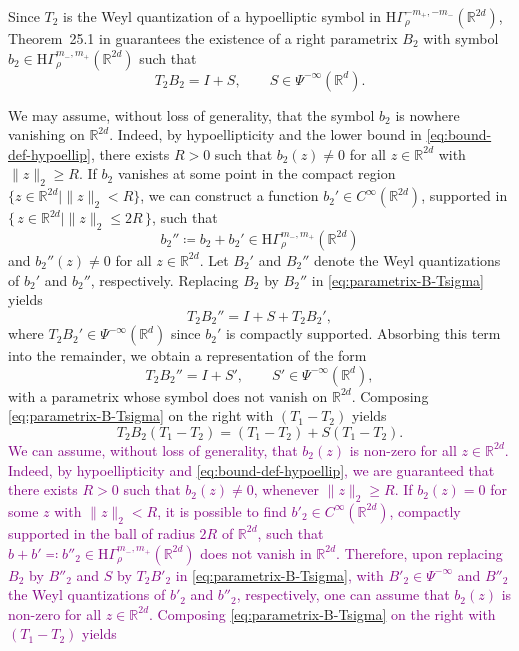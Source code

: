 \documentclass[a4paper,12pt]{article}
\newcommand{\R}{\mathbb{R}}
\newcommand{\hyposymbclass}{\text{H}\Gamma^{m_-,m_+}_\rho}
\newcommand{\hyposymbclassinv}{\mathrm{H}\Gamma^{-m_+,-m_-}_\rho}
\begin{document}
Since $T_2$ is the Weyl quantization of a hypoelliptic symbol in
$\hyposymbclassinv(\R^{2d})$, Theorem~25.1 in
\cite{shubin_pseudodifferential_2001} guarantees the existence of a right
parametrix $B_2$ with symbol $b_2\in\hyposymbclass(\R^{2d})$ such that
\begin{equation}\label{eq:parametrix-B-Tsigma}
    T_2 B_2 = I + S,
    \qquad S\in\Psi^{-\infty}(\R^d).
\end{equation}

We may assume, without loss of generality, that the symbol $b_2$ is nowhere vanishing on $\R^{2d}$. 
Indeed, by hypoellipticity and the lower bound in \eqref{eq:bound-def-hypoellip}, there exists $R>0$ such that
$b_2(z)\neq 0$ for all $z \in \R^{2d}$ with $\|z\|_2 \ge R$. If $b_2$ vanishes at some point in the compact region
$\{z \in \R^{2d} \mid \|z\|_2 < R \}$, we can construct a function
$b_2' \in C^\infty(\R^{2d})$, supported in
$\{\, z \in \R^{2d} \mid \|z\|_2 \le 2R \,\}$, such that
\[
b_2'' \coloneqq b_2 + b_2' \in \hyposymbclass(\R^{2d})
\]
and $b_2''(z) \neq 0$ for all $z \in \R^{2d}$. Let $B_2'$ and $B_2''$ denote the Weyl quantizations of
$b_2'$ and $b_2''$, respectively. Replacing $B_2$ by $B_2''$ in \eqref{eq:parametrix-B-Tsigma}
yields
\[
T_2 B_2'' = I + S + T_2 B_2',
\]
where $T_2 B_2' \in \Psi^{-\infty}(\R^d)$ since $b_2'$ is compactly supported. Absorbing this term
into the remainder, we obtain a representation of the form
\[
T_2 B_2'' = I + S',
\qquad S' \in \Psi^{-\infty}(\R^d),
\]
with a parametrix whose symbol does not vanish on $\R^{2d}$.
Composing \eqref{eq:parametrix-B-Tsigma} on the right with $(T_1 - T_2)$ yields
\[
T_2 B_2 (T_1-T_2) = (T_1-T_2) + S(T_1-T_2).
\]
\iffalse 
\textcolor{purple}{
    We can assume, without loss of generality, that $b_2(z)$ is non-zero for all $z\in \R^{2d}$.
    Indeed, by hypoellipticity and \eqref{eq:bound-def-hypoellip}, we are guaranteed that there exists $R>0$ such that $b_2(z) \neq 0$, whenever $\|z\|_2\geq R$. 
    If $b_2(z) = 0$ for some $z$ with $\|z\|_2< R$, it is possible to find $b'_2 \in C^\infty(\R^{2d})$, compactly supported in the ball of radius $2R$ of $\R^{2d}$, such that $b+b'\eqcolon b''_2 \in\hyposymbclass(\R^{2d})$ does not vanish in $\R^{2d}$.
    Therefore, upon replacing $B_2$ by $B''_2$ and $S$ by $T_2B'_2$ in \eqref{eq:parametrix-B-Tsigma}, with $B'_2\in\Psi^{-\infty}$ and $B''_2$ the Weyl quantizations of $b'_2$ and $b''_2$, respectively, 
    one can assume  that $b_2(z)$ is non-zero for all $z\in \R^{2d}$.
    Composing \eqref{eq:parametrix-B-Tsigma} %
    on the right with $(T_1-T_2)$ yields
}
\end{document}
